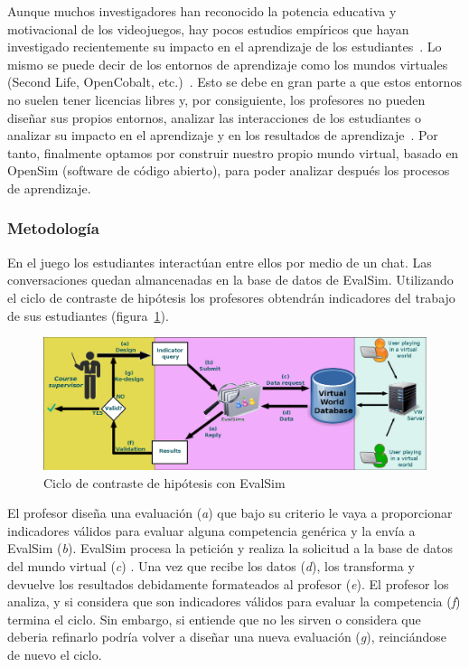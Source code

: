 Aunque muchos investigadores han reconocido la potencia educativa y motivacional de los videojuegos, hay pocos estudios empíricos que hayan investigado recientemente su impacto en el aprendizaje de los estudiantes~\cite{berns2013game}. Lo mismo se puede decir de los entornos de aprendizaje como los mundos virtuales (Second Life, OpenCobalt, etc.)~\cite{hew2010use}. Esto se debe en gran parte a que estos entornos no suelen tener licencias libres y, por consiguiente, los profesores no pueden diseñar sus propios entornos, analizar las interacciones de los estudiantes o analizar su impacto en el aprendizaje y en los resultados de aprendizaje~\cite{cruz2015discovering,moreno2014serious}. Por tanto, finalmente optamos por construir nuestro propio mundo virtual, basado en OpenSim (software de código abierto), para poder analizar después los procesos de aprendizaje.

\subsubsection{Metodología}

En el juego los estudiantes interactúan entre ellos por medio de un chat. Las conversaciones quedan almancenadas en la base de datos de EvalSim. Utilizando el ciclo de contraste de hipótesis los profesores obtendrán indicadores del trabajo de sus estudiantes (figura~\ref{fig:EvalSimArchitecture}).

\begin{figure}
  \begin{center}
    \includegraphics[scale=0.29]{EvalSimArchitecture.png}
  \end{center}
  \caption{Ciclo de contraste de hipótesis con EvalSim}
  \label{fig:EvalSimArchitecture}
\end{figure}

El profesor diseña una evaluación (\emph{a}) que bajo su criterio le vaya a proporcionar indicadores válidos para evaluar alguna competencia genérica y la envía a EvalSim (\emph{b}). EvalSim procesa la petición y realiza la solicitud a la base de datos del mundo virtual (\emph{c}) . Una vez que recibe los datos (\emph{d}), los transforma y devuelve los resultados debidamente formateados al profesor (\emph{e}). El profesor los analiza, y si considera que son indicadores válidos para evaluar la competencia (\emph{f}) termina el ciclo. Sin embargo, si entiende que no les sirven o considera que deberia refinarlo podría volver a diseñar una nueva evaluación (\emph{g}), reinciándose de nuevo el ciclo.

